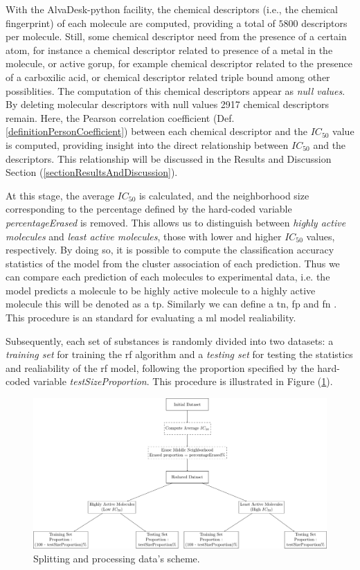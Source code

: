 \documentclass[11pt]{article}
\begin{document}
With the AlvaDesk-python \cite{AlvaDescSecondPaper} facility, the chemical descriptors (i.e., the chemical fingerprint) of each molecule are computed, providing a total of $5800$ descriptors per molecule. Still, some chemical descriptor need from the presence of a certain atom, for instance a chemical descriptor related to presence of a metal in the molecule, or active gorup, for example chemical descriptor related to the presence of a carboxilic acid, or chemical descriptor related triple bound among other possiblities. The computation of this chemical descriptors appear as \emph{null values}. By deleting molecular descriptors with null values 2917 chemical descriptors remain. Here, the Pearson correlation coefficient (Def. \ref{definitionPersonCoefficient}) between each chemical descriptor and the $IC_{50}$ value is computed, providing insight into the direct relationship between $IC_{50}$ and the descriptors. This relationship will be discussed in the Results and Discussion Section (\ref{sectionResultsAndDiscussion}).

At this stage, the average $IC_{50}$ is calculated, and the neighborhood size corresponding to the percentage defined by the hard-coded variable \emph{percentageErased} is removed. This allows us to distinguish between \emph{highly active molecules} and \emph{least active molecules}, those with lower and higher $IC_{50}$ values, respectively. By doing so, it is possible to compute the classification accuracy statistics of the model from the cluster association of each prediction. Thus we can compare each prediction of each molecules to experimental data, i.e. the model predicts a molecule to be highly active molecule to a highly active molecule this will be denoted as a \gls{tp}. Similarly we can define a \gls{tn}, \gls{fp} and \gls{fn} . This procedure is an standard for evaluating a \gls{ml} model realiability. 

Subsequently, each set of substances is randomly divided into two datasets: a \emph{training set} for training the \gls{rf} algorithm and a \emph{testing set} for testing the statistics and realiability of the \gls{rf} model, following the proportion specified by the hard-coded variable \emph{testSizeProportion}. This procedure is illustrated in Figure (\ref{FigureDataSplittingDiagram}).

\begin{figure}[H]
\centering
\includegraphics[width = \textwidth]{GeneralSources/DataSplittingDiagram.pdf}
\caption{Splitting and processing data's scheme.}
\label{FigureDataSplittingDiagram}
\end{figure}
\end{document}

